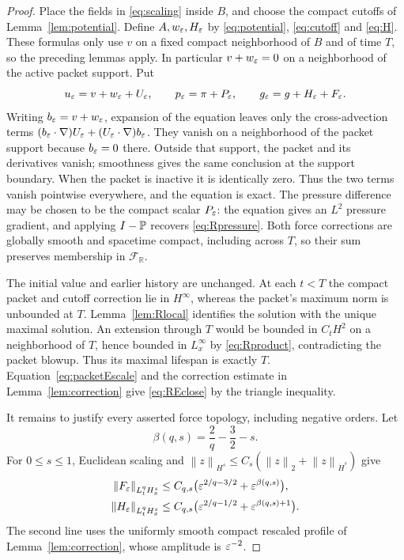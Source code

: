 \documentclass[11pt,a4paper]{article}
\theoremstyle{definition}\newtheorem{definition}[theorem]{Definition}
\theoremstyle{remark}\newtheorem{remark}[theorem]{Remark}
\newcommand{\R}{\mathbb R}\newcommand{\TT}{\mathbb T^3}
\newcommand{\norm}[1]{\left\lVert#1\right\rVert}
\begin{document}
\begin{proof}
Place the fields in \eqref{eq:scaling} inside $B$, and choose the compact cutoffs of Lemma~\ref{lem:potential}. Define $A,w_\varepsilon,H_\varepsilon$ by \eqref{eq:potential}, \eqref{eq:cutoff} and \eqref{eq:H}. These formulas only use $v$ on a fixed compact neighborhood of $B$ and of time $T$, so the preceding lemmas apply. In particular $v+w_\varepsilon=0$ on a neighborhood of the active packet support. Put
\[
 u_\varepsilon=v+w_\varepsilon+U_\varepsilon,\qquad
 p_\varepsilon=\pi+P_\varepsilon,\qquad
 g_\varepsilon=g+H_\varepsilon+F_\varepsilon.
\]
Writing $b_\varepsilon=v+w_\varepsilon$, expansion of the equation leaves only the cross-advection terms $(b_\varepsilon\cdot\nabla)U_\varepsilon+(U_\varepsilon\cdot\nabla)b_\varepsilon$. They vanish on a neighborhood of the packet support because $b_\varepsilon=0$ there. Outside that support, the packet and its derivatives vanish; smoothness gives the same conclusion at the support boundary. When the packet is inactive it is identically zero. Thus the two terms vanish pointwise everywhere, and the equation is exact. The pressure difference may be chosen to be the compact scalar $P_\varepsilon$: the equation gives an $L^2$ pressure gradient, and applying $I-\mathbb P$ recovers \eqref{eq:Rpressure}. Both force corrections are globally smooth and spacetime compact, including across $T$, so their sum preserves membership in $\mathcal F_{\R}$.

The initial value and earlier history are unchanged. At each $t<T$ the compact packet and cutoff correction lie in $H^\infty$, whereas the packet's maximum norm is unbounded at $T$. Lemma~\ref{lem:Rlocal} identifies the solution with the unique maximal solution. An extension through $T$ would be bounded in $C_tH^2$ on a neighborhood of $T$, hence bounded in $L^\infty_x$ by \eqref{eq:Rproduct}, contradicting the packet blowup. Thus its maximal lifespan is exactly $T$. Equation~\eqref{eq:packetEscale} and the correction estimate in Lemma~\ref{lem:correction} give \eqref{eq:REclose} by the triangle inequality.

It remains to justify every asserted force topology, including negative orders. Let
\[
 \beta(q,s)=\frac2q-\frac32-s.
\]
For $0\le s\le1$, Euclidean scaling and
$\norm{z}_{H^s}\le C_s(\norm{z}_2+\norm{z}_{\dot H^s})$ give
\begin{align}
 \norm{F_\eps}_{L^q_tH^s_x}
 &\le C_{q,s}\bigl(\eps^{2/q-3/2}+\eps^{\beta(q,s)}\bigr),\nonumber\\
 \norm{H_\eps}_{L^q_tH^s_x}
 &\le C_{q,s}\bigl(\eps^{2/q-1/2}+\eps^{\beta(q,s)+1}\bigr).
 \label{eq:RpositiveScale}
\end{align}
The second line uses the uniformly smooth compact rescaled profile of Lemma~\ref{lem:correction}, whose amplitude is $\varepsilon^{-2}$.


\end{proof}
\end{document}
